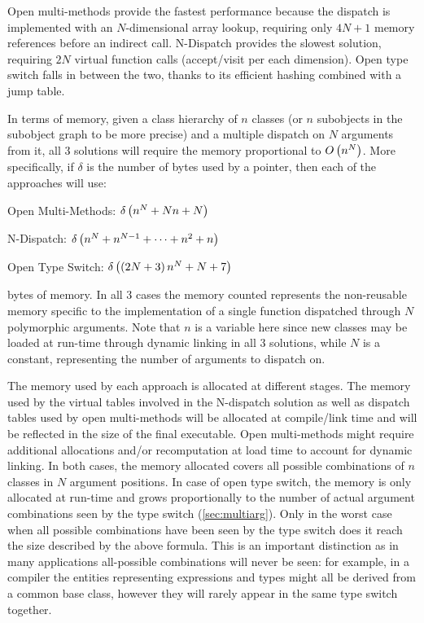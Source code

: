 Open multi-methods provide the fastest performance because the dispatch is 
implemented with an $N$-dimensional array lookup, requiring only $4N+1$ memory 
references before an indirect call. N-Dispatch provides the slowest solution, 
requiring $2N$ virtual function calls (accept/visit per each dimension). Open 
type switch falls in between the two, thanks to its efficient hashing combined 
with a jump table.

In terms of memory, given a class hierarchy of $n$ classes (or $n$ subobjects in 
the subobject graph to be more precise) and a multiple dispatch on $N$ arguments 
from it, all 3 solutions will require the memory proportional to $O\left(n^N\right)$. 
More specifically, if $\delta$ is the number of bytes used by a pointer, then 
each of the approaches will use:

\begin{compactitem}
\setlength{\itemsep}{0pt}
\setlength{\parskip}{0pt}
\item Open Multi-Methods: $\delta\left(n^N+Nn+N\right)$
\item N-Dispatch: $\delta\left(n^N+n^{N-1}+\cdots+n^2+n\right)$
\item Open Type Switch: $\delta\left(\left(2N+3\right)n^N+N+7\right)$
\end{compactitem}

\noindent
bytes of memory. In all 3 cases the memory counted represents the non-reusable 
memory specific to the implementation of a single function dispatched through 
$N$ polymorphic arguments. Note that $n$ is a variable here since new classes 
may be loaded at run-time through dynamic linking in all 3 solutions, while $N$ 
is a constant, representing the number of arguments to dispatch on.

The memory used by each approach is allocated at different stages. The memory 
used by the virtual tables involved in the N-dispatch solution as well as 
dispatch tables used by open multi-methods will be allocated at compile/link 
time and will be reflected in the size of the final executable. Open 
multi-methods might require additional allocations and/or recomputation at load 
time to account for dynamic linking. In both cases, the memory allocated covers 
all possible combinations of $n$ classes in $N$ argument positions. In case of 
open type switch, the memory is only allocated at run-time and grows proportionally 
to the number of actual argument combinations seen by the type switch 
(\textsection\ref{sec:multiarg}). Only in the worst case when all possible 
combinations have been seen by the type switch does it reach the size described 
by the above formula. This is an important distinction as in many applications 
all-possible combinations will never be seen: for example, in a compiler the 
entities representing expressions and types might all be derived from a common 
base class, however they will rarely appear in the same type switch together.

